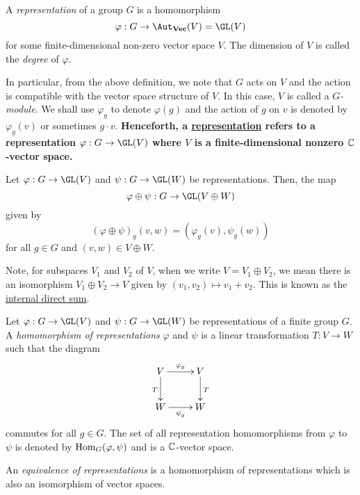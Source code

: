 \begin{definition}[Representation]
    A \textit{representation} of a group $G$ is a homomorphism $$\varphi: G\to\Aut_{\mathbf{Vec}}(V) = \GL(V)$$ for some finite-dimensional non-zero vector space $V$. The dimension of $V$ is called the \textit{degree} of $\varphi$.
\end{definition}

In particular, from the above definition, we note that $G$ acts on $V$ and the action is compatible with the vector space structure of $V$. In this case, $V$ is called a \textit{$G$-module}. We shall use $\varphi_g$ to denote $\varphi(g)$ and the action of $g$ on $v$ is denoted by $\varphi_g(v)$ or sometimes $g\cdot v$. \textbf{Henceforth, a \underline{representation} refers to a representation $\varphi:G\to\GL(V)$ where $V$ is a finite-dimensional nonzero $\mathbb{C}$-vector space.}

\begin{definition}
    Let $\varphi: G\to\GL(V)$ and $\psi: G\to\GL(W)$ be representations. Then, the map 
    \begin{equation*}
        \varphi\oplus\psi: G\to\GL(V\oplus W)
    \end{equation*}
    given by 
    \begin{equation*}
        \left(\varphi\oplus\psi\right)_g(v,w) = \left(\varphi_g(v),\psi_g(w)\right)
    \end{equation*}
    for all $g\in G$ and $(v,w)\in V\oplus W$.
\end{definition}

Note, for subspaces $V_1$ and $V_2$ of $V$, when we write $V = V_1\oplus V_2$, we mean there is an isomorphism $V_1\oplus V_2\to V$ given by $(v_1,v_2)\mapsto v_1 + v_2$. This is known as the \underline{internal direct sum}.

\begin{definition}
    Let $\varphi: G\to\GL(V)$ and $\psi: G\to\GL(W)$ be representations of a finite group $G$. A \textit{homomorphism of representations} $\varphi$ and $\psi$ is a linear transformation $T: V\to W$ such that the diagram 
    \begin{equation*}
        \xymatrix{
            V\ar[r]^{\varphi_g}\ar[d]_T & V\ar[d]^T\\
            W\ar[r]_{\psi_g} & W
        }
    \end{equation*}
    commutes for all $g\in G$. The set of all representation homomorphisms from $\varphi$ to $\psi$ is denoted by $\operatorname{Hom}_G(\varphi,\psi)$ and is a $\mathbb{C}$-vector space.
    
    An \textit{equivalence of representations} is a homomorphism of representations which is also an isomorphism of vector spaces.
\end{definition}

